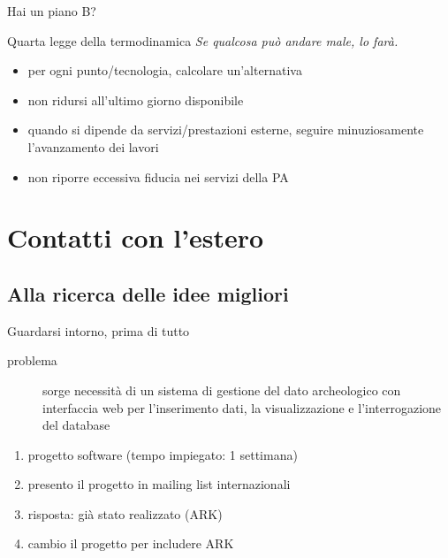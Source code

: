 \documentclass{beamer}
\begin{document}
		\begin{frame}{Hai un piano B?}

			\begin{block}{Quarta legge della termodinamica}
				\emph{Se qualcosa può andare male, lo farà.}\\
			\end{block}

			\begin{itemize}
				\item per ogni punto/tecnologia, calcolare un'alternativa
				\item non ridursi all'ultimo giorno disponibile
				\item quando si dipende da servizi/prestazioni esterne, seguire minuziosamente l'avanzamento dei lavori
				\item non riporre eccessiva fiducia nei servizi della PA
			\end{itemize}
		\end{frame}

	\section{Contatti con l'estero}

		\subsection{Alla ricerca delle idee migliori}

			\begin{frame}{Guardarsi intorno, prima di tutto}
				\begin{description}
					\item[problema] sorge necessità di un sistema di gestione del dato archeologico con interfaccia web per l'inserimento dati, la visualizzazione e l'interrogazione del database
				\end{description}

				\begin{enumerate}
					\item progetto software (tempo impiegato: 1 settimana)
					\item presento il progetto in mailing list internazionali
					\item risposta: già stato realizzato (ARK)
					\item cambio il progetto per includere ARK
				\end{enumerate}
			\end{frame}
\end{document}
